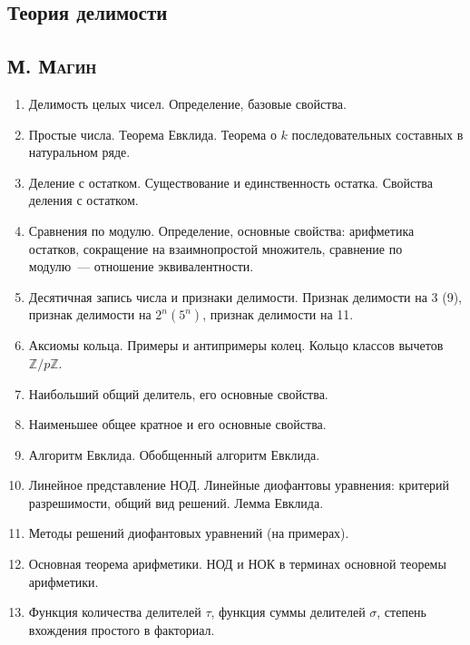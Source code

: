 \documentclass[12pt]{article}
\begin{document}
\begin{center}
    \section*{Теория делимости}
    \subsection*{\textsc{М. Магин}}
\end{center}

\begin{enumerate}
    \item Делимость целых чисел. Определение, базовые свойства.
    \item Простые числа. Теорема Евклида. Теорема о $k$ последовательных составных в натуральном ряде.
    \item Деление с остатком. Существование и единственность остатка. Свойства деления с остатком.
    \item Сравнения по модулю. Определение, основные свойства: арифметика остатков, сокращение на взаимнопростой множитель, сравнение по модулю~--- отношение эквивалентности.
    \item Десятичная запись числа и признаки делимости. Признак делимости на 3 (9), признак делимости на $2^n (5^n)$, признак делимости на 11.
    \item Аксиомы кольца. Примеры и антипримеры колец. Кольцо классов вычетов $\mathbb{Z}/p\mathbb{Z}$.
    \item Наибольший общий делитель, его основные свойства.
    \item Наименьшее общее кратное и его основные свойства.
    \item Алгоритм Евклида. Обобщенный алгоритм Евклида.
    \item Линейное представление НОД. Линейные диофантовы уравнения: критерий разрешимости, общий вид решений.  Лемма Евклида.
    \item Методы решений диофантовых уравнений (на примерах).
    \item Основная теорема арифметики. НОД и НОК в терминах основной теоремы арифметики.
    \item Функция количества делителей $\tau$, функция суммы делителей $\sigma$, степень вхождения простого в факториал.
\end{enumerate}
\end{document}
